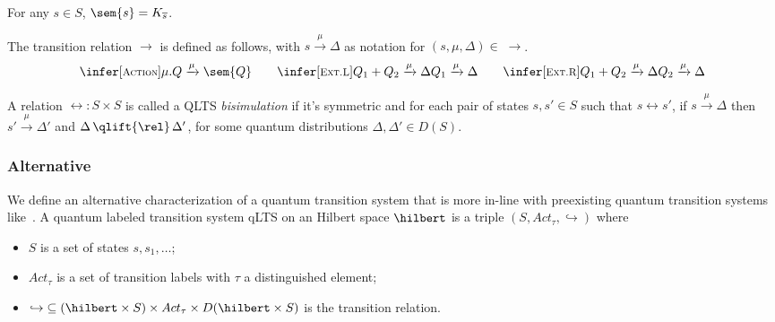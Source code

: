 \begin{proposition}
	For any $s \in S$, $\sem{s} = K_{\overline{s}}$.
\end{proposition}

The transition relation $\to$ is defined as follows, with $s \xrightarrow{\mu} \Delta$ as notation for $(s, \mu, \Delta) \in\;\to$.
\begin{gather*}
  \infer[\mbox{\footnotesize\scshape Action}]{\mu.Q \xrightarrow{\mu} \sem{Q}}{} \qquad 
  \infer[\mbox{\footnotesize\scshape Ext.L}]{Q_1 + Q_2 \xrightarrow{\mu} \Delta}{Q_1 \xrightarrow{\mu} \Delta} \qquad
  \infer[\mbox{\footnotesize\scshape Ext.R}]{Q_1 + Q_2 \xrightarrow{\mu} \Delta}{Q_2 \xrightarrow{\mu} \Delta}
\end{gather*}

\begin{definition}
	A relation $\rel : S \times S$ is called a QLTS \emph{bisimulation} if it's symmetric and for each pair of states $s, s' \in S$ such that $s \rel s'$,
	if $s \xrightarrow{\mu} \Delta$ then $s' \xrightarrow{\mu} \Delta'$ and $\Delta\,\qlift{\rel}\,\Delta'$, for some quantum distributions $\Delta, \Delta' \in D(S)$.
\end{definition}


\subsubsection{Alternative}
We define an alternative characterization of a quantum transition system that is more in-line with preexisting quantum transition systems like~\cite{Feng:2012, Deng:2012}.
A quantum labeled transition system qLTS on an Hilbert space $\hilbert$ is a triple $(S, Act_\tau, \hookrightarrow)$ where
\begin{itemize}
	\item $S$ is a set of states $s, s_1, \dots$;
	\item $Act_\tau$ is a set of transition labels with $\tau$ a distinguished element;
  \item $\hookrightarrow\;\subseteq (\hilbert \times S) \times Act_\tau \times D(\hilbert \times S)$ is the transition relation. 
\end{itemize}

